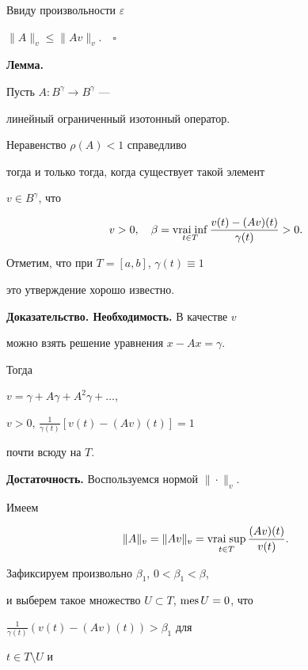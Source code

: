 Ввиду произвольности $\varepsilon$\;


$\|A\|_v\leq \|Av\|_v.\quad\square$


\medskip





{\bf Лемма.} {\it


Пусть $A:B^\gamma\to B^\gamma$ ---


линейный ограниченный изотонный оператор.


Неравенство $\rho(A)<1$ справедливо


тогда и только тогда, когда существует такой элемент


$v\in B^\gamma$, что


$$


v>0,\quad \beta = \vraiinf_{t\in T}\frac{v(t)-(Av)(t)}{\gamma(t)}>0.


$$


}





Отметим, что при $T=[a,b]$, $\gamma(t)\equiv 1$


это утверждение хорошо известно.





{\bf Доказательство. Необходимость.} В качестве $v$


можно взять решение уравнения $x-Ax=\gamma$.


Тогда


$v=\gamma + A\gamma + A^2\gamma + \dotsc$,


$v>0$, $\frac{1}{\gamma(t)}[v(t)-(Av)(t)] = 1$


почти всюду на $T$.


\smallskip





{\bf Достаточность.} Воспользуемся нормой $\|\cdot\|_v$.


Имеем


$$


\|A\|_v = \|Av\|_v = \vraisup_{t\in T}\frac{(Av)(t)}{v(t)}.


$$


Зафиксируем произвольно $\beta_1$, $0<\beta_1<\beta$,


и выберем такое множество $U\subset T$, $\operatorname{mes} U=0$, что


$\frac{1}{\gamma(t)}(v(t)-(Av)(t)) >\beta_1$ для


$t\in T\setminus U$ и


